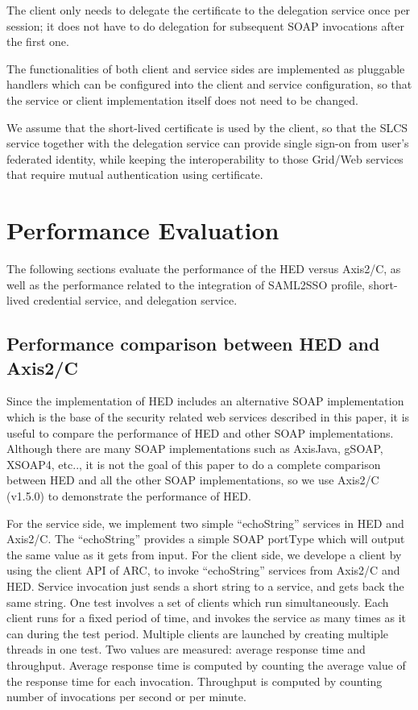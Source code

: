 \documentclass[conference]{IEEEtran}
\begin{document}
The client only needs to delegate the certificate to the delegation service once
per session; it does not have to do delegation for subsequent SOAP invocations after the first one.

The functionalities of both client and service sides are implemented as
pluggable handlers which can be configured into the client and service configuration, so that the service or
client implementation itself does not need to be changed.

We assume that the short-lived certificate is used by the client, so that the
SLCS service together with the delegation service can provide single sign-on from user's federated
identity, while keeping the interoperability to those Grid/Web services that require mutual authentication
using certificate.

\section{Performance Evaluation}
\label{sec:perfeval}
The following sections evaluate the performance of the HED versus Axis2/C, as 
well as the performance related to the integration of SAML2SSO profile, 
short-lived credential service, and delegation service.

\subsection{Performance comparison between HED and Axis2/C}
\label{sec:perhedandaxis}
Since the implementation of HED includes an alternative SOAP implementation
which is the base of the security related web services described in this paper, it is useful to
compare the performance of HED and other SOAP implementations. Although there are many SOAP
implementations such as AxisJava, gSOAP, XSOAP4, etc.., it is not the goal of this paper to do a
complete comparison between HED and all the other SOAP implementations, so we use Axis2/C (v1.5.0) to
demonstrate the performance of HED.

For the service side, we implement two simple ``echoString'' services in HED and
Axis2/C. The ``echoString'' provides a simple SOAP portType which will output the same value
as it gets from input. For the client side, we develope a client by using the client API of ARC, to
invoke ``echoString'' services from Axis2/C and HED. Service invocation just sends a short
string to a service, and gets back the same string. One test involves a set of clients
which run simultaneously. Each client runs for a fixed period of time, and invokes the service as many
times as it can during the test period. Multiple clients are launched by creating multiple threads in
one test. Two values are measured: average response time and throughput. Average response
time is computed by counting the average value of the response time for each invocation.
Throughput is computed by counting number of invocations per second or per minute.
\end{document}
